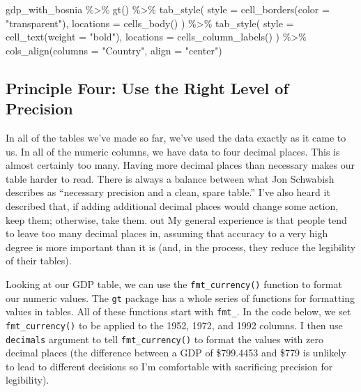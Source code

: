 \documentclass[
]{book}
\newenvironment{Shaded}{\begin{snugshade}}{\end{snugshade}}
\newcommand{\AttributeTok}[1]{\textcolor[rgb]{0.77,0.63,0.00}{#1}}
\newcommand{\FunctionTok}[1]{\textcolor[rgb]{0.00,0.00,0.00}{#1}}
\newcommand{\NormalTok}[1]{#1}
\newcommand{\SpecialCharTok}[1]{\textcolor[rgb]{0.00,0.00,0.00}{#1}}
\newcommand{\StringTok}[1]{\textcolor[rgb]{0.31,0.60,0.02}{#1}}
\begin{document}
\begin{Shaded}
\begin{Highlighting}[]
\NormalTok{gdp\_with\_bosnia }\SpecialCharTok{\%\textgreater{}\%} 
  \FunctionTok{gt}\NormalTok{() }\SpecialCharTok{\%\textgreater{}\%} 
  \FunctionTok{tab\_style}\NormalTok{(}
    \AttributeTok{style =} \FunctionTok{cell\_borders}\NormalTok{(}\AttributeTok{color =} \StringTok{"transparent"}\NormalTok{),}
    \AttributeTok{locations =} \FunctionTok{cells\_body}\NormalTok{()}
\NormalTok{  ) }\SpecialCharTok{\%\textgreater{}\%} 
  \FunctionTok{tab\_style}\NormalTok{(}
    \AttributeTok{style =} \FunctionTok{cell\_text}\NormalTok{(}\AttributeTok{weight =} \StringTok{"bold"}\NormalTok{),}
    \AttributeTok{locations =} \FunctionTok{cells\_column\_labels}\NormalTok{()}
\NormalTok{  ) }\SpecialCharTok{\%\textgreater{}\%} 
  \FunctionTok{cols\_align}\NormalTok{(}\AttributeTok{columns =} \StringTok{"Country"}\NormalTok{,}
             \AttributeTok{align =} \StringTok{"center"}\NormalTok{)}
\end{Highlighting}
\end{Shaded}

\hypertarget{principle-four-use-the-right-level-of-precision}{%
\subsection*{Principle Four: Use the Right Level of Precision}\label{principle-four-use-the-right-level-of-precision}}

In all of the tables we've made so far, we've used the data exactly as it came to us. In all of the numeric columns, we have data to four decimal places. This is almost certainly too many. Having more decimal places than necessary makes our table harder to read. There is always a balance between what Jon Schwabish describes as ``necessary precision and a clean, spare table.'' I've also heard it described that, if adding additional decimal places would change some action, keep them; otherwise, take them. out My general experience is that people tend to leave too many decimal places in, assuming that accuracy to a very high degree is more important than it is (and, in the process, they reduce the legibility of their tables).

Looking at our GDP table, we can use the \texttt{fmt\_currency()} function to format our numeric values. The \texttt{gt} package has a whole series of functions for formatting values in tables. All of these functions start with \texttt{fmt\_}. In the code below, we set \texttt{fmt\_currency()} to be applied to the 1952, 1972, and 1992 columns. I then use \texttt{decimals} argument to tell \texttt{fmt\_currency()} to format the values with zero decimal places (the difference between a GDP of \$799.4453 and \$779 is unlikely to lead to different decisions so I'm comfortable with sacrificing precision for legibility).
\end{document}

